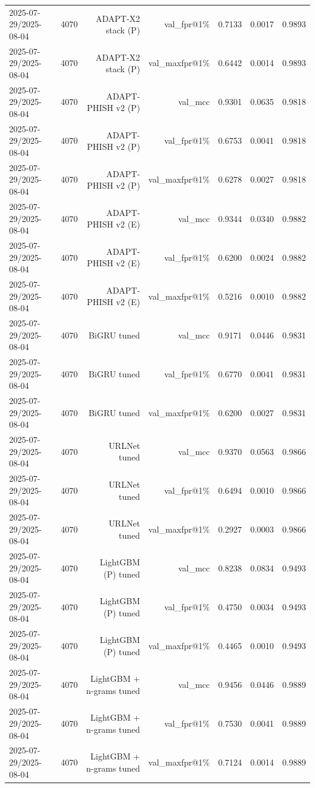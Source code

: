 \begin{table}[t]
\begin{tabular}{llrrrrr}
2025-07-29/2025-08-04 & 4070 & ADAPT-X2 stack (P) & val\_fpr@1\% & 0.7133 & 0.0017 & 0.9893 \\
2025-07-29/2025-08-04 & 4070 & ADAPT-X2 stack (P) & val\_maxfpr@1\% & 0.6442 & 0.0014 & 0.9893 \\
2025-07-29/2025-08-04 & 4070 & ADAPT-PHISH v2 (P) & val\_mcc & 0.9301 & 0.0635 & 0.9818 \\
2025-07-29/2025-08-04 & 4070 & ADAPT-PHISH v2 (P) & val\_fpr@1\% & 0.6753 & 0.0041 & 0.9818 \\
2025-07-29/2025-08-04 & 4070 & ADAPT-PHISH v2 (P) & val\_maxfpr@1\% & 0.6278 & 0.0027 & 0.9818 \\
2025-07-29/2025-08-04 & 4070 & ADAPT-PHISH v2 (E) & val\_mcc & 0.9344 & 0.0340 & 0.9882 \\
2025-07-29/2025-08-04 & 4070 & ADAPT-PHISH v2 (E) & val\_fpr@1\% & 0.6200 & 0.0024 & 0.9882 \\
2025-07-29/2025-08-04 & 4070 & ADAPT-PHISH v2 (E) & val\_maxfpr@1\% & 0.5216 & 0.0010 & 0.9882 \\
2025-07-29/2025-08-04 & 4070 & BiGRU tuned & val\_mcc & 0.9171 & 0.0446 & 0.9831 \\
2025-07-29/2025-08-04 & 4070 & BiGRU tuned & val\_fpr@1\% & 0.6770 & 0.0041 & 0.9831 \\
2025-07-29/2025-08-04 & 4070 & BiGRU tuned & val\_maxfpr@1\% & 0.6200 & 0.0027 & 0.9831 \\
2025-07-29/2025-08-04 & 4070 & URLNet tuned & val\_mcc & 0.9370 & 0.0563 & 0.9866 \\
2025-07-29/2025-08-04 & 4070 & URLNet tuned & val\_fpr@1\% & 0.6494 & 0.0010 & 0.9866 \\
2025-07-29/2025-08-04 & 4070 & URLNet tuned & val\_maxfpr@1\% & 0.2927 & 0.0003 & 0.9866 \\
2025-07-29/2025-08-04 & 4070 & LightGBM (P) tuned & val\_mcc & 0.8238 & 0.0834 & 0.9493 \\
2025-07-29/2025-08-04 & 4070 & LightGBM (P) tuned & val\_fpr@1\% & 0.4750 & 0.0034 & 0.9493 \\
2025-07-29/2025-08-04 & 4070 & LightGBM (P) tuned & val\_maxfpr@1\% & 0.4465 & 0.0010 & 0.9493 \\
2025-07-29/2025-08-04 & 4070 & LightGBM + n-grams tuned & val\_mcc & 0.9456 & 0.0446 & 0.9889 \\
2025-07-29/2025-08-04 & 4070 & LightGBM + n-grams tuned & val\_fpr@1\% & 0.7530 & 0.0041 & 0.9889 \\
2025-07-29/2025-08-04 & 4070 & LightGBM + n-grams tuned & val\_maxfpr@1\% & 0.7124 & 0.0014 & 0.9889 \\

\end{tabular}
\end{table}

